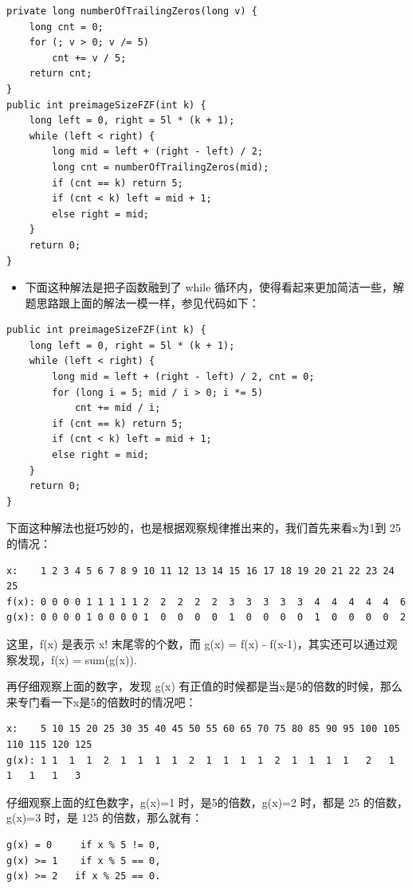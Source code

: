\documentclass[9pt, b5paper]{article}
\begin{document}
\begin{verbatim}
private long numberOfTrailingZeros(long v) {
    long cnt = 0;
    for (; v > 0; v /= 5) 
        cnt += v / 5;
    return cnt;
}
public int preimageSizeFZF(int k) {
    long left = 0, right = 5l * (k + 1);
    while (left < right) {
        long mid = left + (right - left) / 2;
        long cnt = numberOfTrailingZeros(mid);
        if (cnt == k) return 5;
        if (cnt < k) left = mid + 1;
        else right = mid;
    }
    return 0;
}
\end{verbatim}
\begin{itemize}
\item 下面这种解法是把子函数融到了 while 循环内，使得看起来更加简洁一些，解题思路跟上面的解法一模一样，参见代码如下：
\end{itemize}
\begin{verbatim}
public int preimageSizeFZF(int k) {
    long left = 0, right = 5l * (k + 1);
    while (left < right) {
        long mid = left + (right - left) / 2, cnt = 0;
        for (long i = 5; mid / i > 0; i *= 5) 
            cnt += mid / i;
        if (cnt == k) return 5;
        if (cnt < k) left = mid + 1;
        else right = mid;
    }
    return 0;
}
\end{verbatim}

下面这种解法也挺巧妙的，也是根据观察规律推出来的，我们首先来看x为1到 25 的情况：
\begin{verbatim}
x:    1 2 3 4 5 6 7 8 9 10 11 12 13 14 15 16 17 18 19 20 21 22 23 24 25
f(x): 0 0 0 0 1 1 1 1 1 2  2  2  2  2  3  3  3  3  3  4  4  4  4  4  6
g(x): 0 0 0 0 1 0 0 0 0 1  0  0  0  0  1  0  0  0  0  1  0  0  0  0  2
\end{verbatim}

这里，f(x) 是表示 x! 末尾零的个数，而 g(x) = f(x) - f(x-1)，其实还可以通过观察发现，f(x) = sum(g(x)).

再仔细观察上面的数字，发现 g(x) 有正值的时候都是当x是5的倍数的时候，那么来专门看一下x是5的倍数时的情况吧：

\begin{verbatim}
x:    5 10 15 20 25 30 35 40 45 50 55 60 65 70 75 80 85 90 95 100 105 110 115 120 125
g(x): 1 1  1  1  2  1  1  1  1  2  1  1  1  1  2  1  1  1  1   2   1   1   1   1   3
\end{verbatim}

仔细观察上面的红色数字，g(x)=1 时，是5的倍数，g(x)=2 时，都是 25 的倍数，g(x)=3 时，是 125 的倍数，那么就有：
\begin{verbatim}
g(x) = 0     if x % 5 != 0,
g(x) >= 1    if x % 5 == 0,
g(x) >= 2   if x % 25 == 0.
\end{verbatim}
\end{document}
